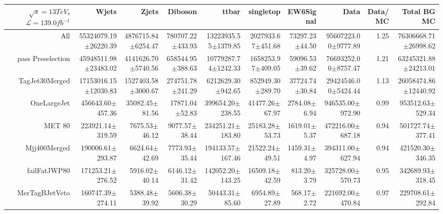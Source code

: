  \begin{tabular}{ r ||  r  r  r  r  r  r || r r r |} 
 \ensuremath{\sqrt{s}=13 TeV}, \ensuremath{\mathcal{L}=139.0 fb^{-1}}  & Wjets & Zjets & Diboson & ttbar & singletop & EW6Signal& Data & Data/MC & Total BG MC \tabularnewline 
 \hline 
All & 55324079.19$\pm$26220.39 & 4876715.84$\pm$6254.47 & 780707.22$\pm$433.93 & 13223935.55$\pm$1379.85 & 2027933.67$\pm$451.68 & 73297.23$\pm$44.50 & 95607223.00$\pm$9777.89 & 1.25 & 76306668.71$\pm$26998.62\tabularnewline \hline 
pass Preselection & 45948511.98$\pm$23483.02 & 4141626.70$\pm$5740.56 & 658544.95$\pm$388.63 & 10779287.74$\pm$1242.33 & 1658253.97$\pm$409.05 & 59096.53$\pm$39.62 & 76693252.00$\pm$8757.47 & 1.21 & 63245321.88$\pm$24213.01\tabularnewline \hline 
TagJet30Merged & 17153016.15$\pm$12030.83 & 1527403.58$\pm$3000.67 & 274751.78$\pm$241.29 & 6212629.30$\pm$942.65 & 852949.30$\pm$289.70 & 37724.74$\pm$30.84 & 29424546.00$\pm$5424.44 & 1.13 & 26058474.86$\pm$12440.92\tabularnewline \hline 
OneLargeJet & 456643.60$\pm$457.36 & 35082.45$\pm$81.56 & 17871.04$\pm$52.83 & 399654.20$\pm$238.55 & 41477.26$\pm$67.97 & 2784.08$\pm$6.94 & 946535.00$\pm$972.90 & 0.99 & 953512.63$\pm$529.34\tabularnewline \hline 
MET 80 & 223921.14$\pm$319.59 & 7675.53$\pm$46.12 & 9077.57$\pm$38.44 & 234251.21$\pm$183.80 & 25183.28$\pm$53.73 & 1619.01$\pm$5.37 & 472216.00$\pm$687.18 & 0.94 & 501727.74$\pm$377.41\tabularnewline \hline 
Mjj400Merged & 190006.61$\pm$293.87 & 6624.64$\pm$42.69 & 7773.93$\pm$35.44 & 194133.57$\pm$167.46 & 21522.24$\pm$49.51 & 1459.31$\pm$4.97 & 394311.00$\pm$627.94 & 0.94 & 421520.30$\pm$346.35\tabularnewline \hline 
failFatJWP80 & 171253.21$\pm$276.52 & 5916.02$\pm$40.14 & 6146.12$\pm$31.42 & 142052.20$\pm$143.25 & 16509.18$\pm$42.59 & 813.20$\pm$3.79 & 325728.00$\pm$570.73 & 0.95 & 342689.93$\pm$318.45\tabularnewline \hline 
MerTagBJetVeto & 160747.39$\pm$274.11 & 5388.48$\pm$39.92 & 5606.38$\pm$30.29 & 50443.31$\pm$85.60 & 6954.89$\pm$27.89 & 568.17$\pm$2.72 & 221692.00$\pm$470.84 & 0.97 & 229708.61$\pm$292.84\tabularnewline \hline 
\end{tabular}
